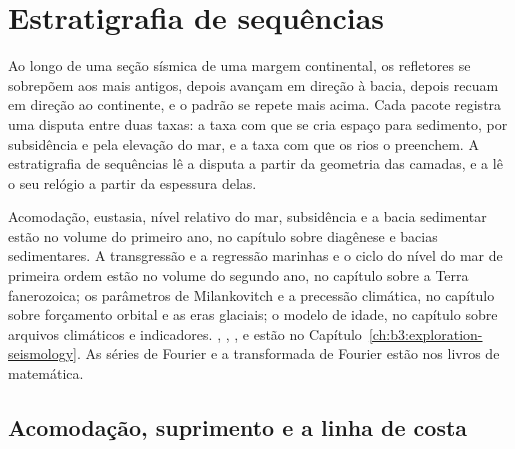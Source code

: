 \chapter{Estratigrafia de sequências}\label{ch:b3:sequence-stratigraphy}

Ao longo de uma seção sísmica de uma margem continental, os refletores se sobrepõem aos mais antigos,
depois avançam em direção à bacia, depois recuam em direção ao continente, e
o padrão se repete mais acima. Cada pacote registra uma disputa entre
duas taxas: a taxa com que se cria espaço para sedimento, por subsidência e pela
elevação do mar, e a taxa com que os rios o preenchem. A estratigrafia de sequências
lê a disputa a partir da geometria das camadas, e a
 lê o seu relógio a partir da espessura delas.

\begin{recall}
Acomodação, eustasia, nível relativo do mar, subsidência e a
bacia sedimentar estão no volume do primeiro ano, no capítulo sobre diagênese e bacias
sedimentares. A transgressão e a regressão marinhas e o ciclo do nível do mar de primeira
ordem estão no volume do segundo ano, no capítulo sobre a Terra fanerozoica; os
parâmetros de Milankovitch e a precessão climática, no capítulo sobre forçamento orbital
e as eras glaciais; o modelo de idade, no capítulo sobre arquivos climáticos
e indicadores. , , ,  e 
estão no Capítulo~\ref{ch:b3:exploration-seismology}. As séries de Fourier
e a transformada de Fourier estão nos livros de matemática.
\end{recall}

\section{Acomodação, suprimento e a linha de costa}\label{sec:b3:sequence-stratigraphy:shoreline}

